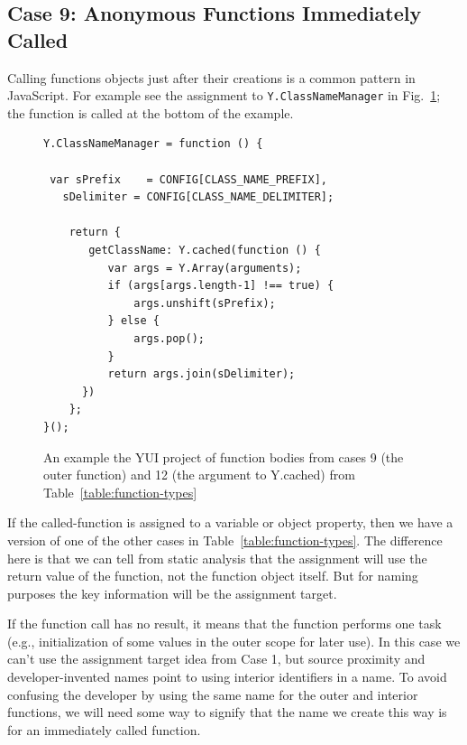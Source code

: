 \documentclass[10pt, preprint]{sigplanconf}
\begin{document}
\subsection{Case 9: Anonymous Functions Immediately Called}
Calling functions objects just after their creations is a common pattern in JavaScript. For example see the assignment to \verb|Y.ClassNameManager| in Fig.~\ref{fig:classnamemanager}; the function is called at the bottom of the example. 
\begin{figure}[htp]
\begin{verbatim}
Y.ClassNameManager = function () {

 var sPrefix    = CONFIG[CLASS_NAME_PREFIX],
   sDelimiter = CONFIG[CLASS_NAME_DELIMITER];

    return {
       getClassName: Y.cached(function () {
          var args = Y.Array(arguments);
          if (args[args.length-1] !== true) {
              args.unshift(sPrefix);
          } else {
              args.pop();
          }
          return args.join(sDelimiter);
      })
    };
}();
\end{verbatim}
\label{fig:classnamemanager}
\caption{An example the YUI project of function bodies from cases 9 (the outer function)  and 12  (the argument to Y.cached) from Table~\ref{table:function-types}  }
\end{figure}

If the called-function is assigned to a variable or object property, then we have a version of one of the other cases in Table~\ref{table:function-types}. The difference here is that we can tell from static analysis that the assignment will use the return value of the function, not the function object itself. But for naming purposes the key information will be the assignment target.

If the function call has no result, it means that the function performs one task (e.g., initialization of some values in the outer scope for later use). In this case we can't use the assignment target idea from Case 1, but source proximity and developer-invented names point to using interior identifiers in a name. To avoid confusing the developer by using the same name for the outer and interior functions, we will need some way to signify that the name we create this way is for an immediately called function.
\end{document}
